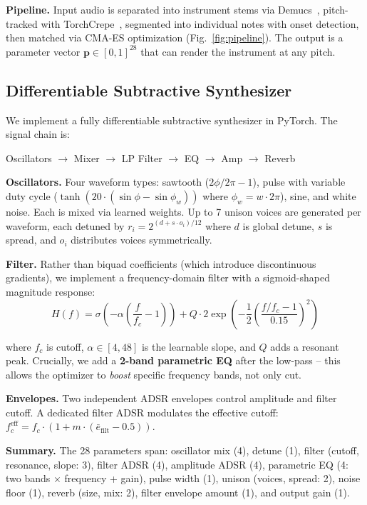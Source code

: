\documentclass[10pt,twocolumn]{article}
\begin{document}
\textbf{Pipeline.} Input audio is separated into instrument stems via Demucs~\cite{defossez2021hybrid}, pitch-tracked with TorchCrepe~\cite{kim2018crepe}, segmented into individual notes with onset detection, then matched via CMA-ES optimization (Fig.~\ref{fig:pipeline}). The output is a parameter vector $\mathbf{p} \in [0,1]^{28}$ that can render the instrument at any pitch.

\subsection{Differentiable Subtractive Synthesizer}

We implement a fully differentiable subtractive synthesizer in PyTorch. The signal chain is:

\smallskip
\centerline{Oscillators $\to$ Mixer $\to$ LP Filter $\to$ EQ $\to$ Amp $\to$ Reverb}
\smallskip

\textbf{Oscillators.} Four waveform types: sawtooth ($2\phi/2\pi - 1$), pulse with variable duty cycle ($\tanh(20 \cdot (\sin\phi - \sin\phi_w))$ where $\phi_w = w \cdot 2\pi$), sine, and white noise. Each is mixed via learned weights. Up to 7 unison voices are generated per waveform, each detuned by $r_i = 2^{(d + s \cdot o_i)/12}$ where $d$ is global detune, $s$ is spread, and $o_i$ distributes voices symmetrically.

\textbf{Filter.} Rather than biquad coefficients (which introduce discontinuous gradients), we implement a frequency-domain filter with a sigmoid-shaped magnitude response:
\vspace{-1mm}
\begin{equation}
H(f) = \sigma\!\left(-\alpha\!\left(\frac{f}{f_c} - 1\right)\right) + Q \cdot 2\exp\!\left(-\frac{1}{2}\left(\frac{f/f_c - 1}{0.15}\right)^{\!2}\right)
\end{equation}
\vspace{-1mm}

\noindent where $f_c$ is cutoff, $\alpha \in [4,48]$ is the learnable slope, and $Q$ adds a resonant peak. Crucially, we add a \textbf{2-band parametric EQ} after the low-pass -- this allows the optimizer to \emph{boost} specific frequency bands, not only cut.

\textbf{Envelopes.} Two independent ADSR envelopes control amplitude and filter cutoff. A dedicated filter ADSR modulates the effective cutoff: $f_c^{\text{eff}} = f_c \cdot (1 + m \cdot (\bar{e}_{\text{filt}} - 0.5))$.

\textbf{Summary.} The 28 parameters span: oscillator mix (4), detune (1), filter (cutoff, resonance, slope: 3), filter ADSR (4), amplitude ADSR (4), parametric EQ (4: two bands $\times$ frequency + gain), pulse width (1), unison (voices, spread: 2), noise floor (1), reverb (size, mix: 2), filter envelope amount (1), and output gain (1).
\end{document}
